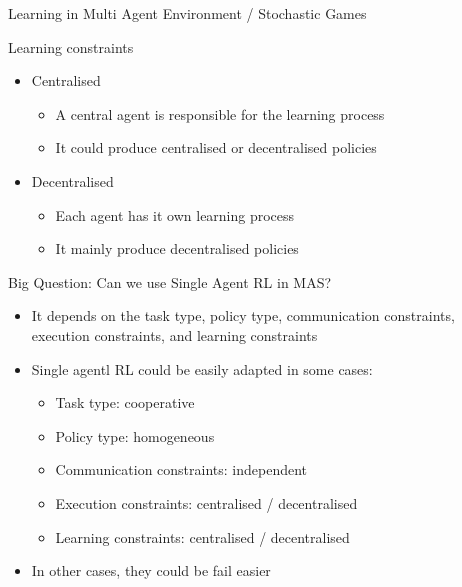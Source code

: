 \documentclass[presentation, 8pt]{beamer}\mode<presentation>{\usetheme{AMSBolognaFC}}
\begin{document}
\begin{frame}[allowframebreaks]{Learning in Multi Agent Environment / Stochastic Games}
\begin{exampleblock}{Learning constraints}
\begin{itemize}
	\item Centralised
	\begin{itemize}
		\item A central agent is responsible for the learning process
		\item It could produce centralised or decentralised policies
	\end{itemize}
	\item Decentralised
	\begin{itemize}
		\item Each agent has it own learning process
		\item It mainly produce decentralised policies
	\end{itemize}
\end{itemize}
\end{exampleblock}

\begin{alertblock}{Big Question: Can we use Single Agent RL in MAS?}
\begin{itemize}
	\item It depends on the task type, policy type, communication constraints, execution constraints, and learning constraints
	\item Single agentl RL could be easily adapted in some cases:
	\begin{itemize}
		\item Task type: cooperative
		\item Policy type: homogeneous
		\item Communication constraints: independent
		\item Execution constraints: centralised / decentralised
		\item Learning constraints: centralised / decentralised
	\end{itemize}
	\item In other cases, they could be fail easier
\end{itemize}
\end{alertblock}
\end{frame}
\end{document}
